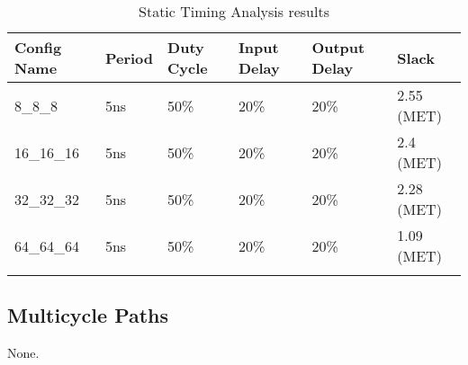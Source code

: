 \renewcommand*{\arraystretch}{1.4}
\begin{longtable}[H]{
    | p{}
    | p{}
    | p{}
    | p{}
    | p{}
    | p{} |
  }
  \hline
  \textbf{Config Name}   &
  \textbf{Period}        &
  \textbf{Duty Cycle}    &
  \textbf{Input Delay}   &
  \textbf{Output Delay}  &
  \textbf{Slack}           \\ \hline \hline

  8\_8\_8 &
  5ns &
  50\% &
  20\% &
  20\% &
  2.55 (MET) \\ \hline

  16\_16\_16 &
  5ns &
  50\% &
  20\% &
  20\% &
  2.4 (MET) \\ \hline

  32\_32\_32 &
  5ns &
  50\% &
  20\% &
  20\% &
  2.28 (MET) \\ \hline

  64\_64\_64 &
  5ns &
  50\% &
  20\% &
  20\% &
  1.09 (MET) \\ \hline

  \caption{Static Timing Analysis results}\label{table:timing}
\end{longtable}

\subsection{Multicycle Paths}
None.